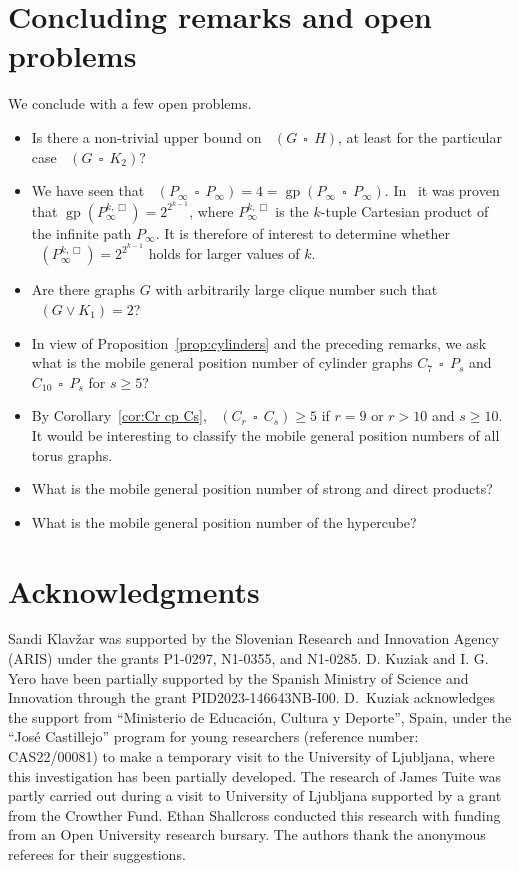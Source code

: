 \documentclass[a4paper,12pt]{article}
\DeclareMathOperator{\mob}{Mob_{gp}}
\DeclareMathOperator{\gp}{gp}
\DeclareMathOperator{\cp}{\,\square\,}
\theoremstyle{definition}
\begin{document}
	
	\section{Concluding remarks and open problems}
	\label{sec:conclude}
	
	We conclude with a few open problems.
	
	\begin{itemize}
		\item Is there a non-trivial upper bound on $\mob(G\cp H)$, at least for the particular case $\mob(G\cp K_2)$?
		\item We have seen that $\mob(P_\infty\cp P_\infty)=4=\gp(P_\infty\cp P_\infty)$. In~\cite[Theorem 1]{KlavzarRus} it was proven that $\gp(P_\infty^{k,\Box})= 2^{2^{k-1}}$, where $P_\infty^{k,\Box}$ is the $k$-tuple Cartesian product of the infinite path $P_\infty$. It is therefore of interest to determine whether $\mob(P_\infty^{k,\Box})= 2^{2^{k-1}}$ holds for larger values of $k$.
		\item Are there graphs $G$ with arbitrarily large clique number such that $\mob (G \vee K_1) = 2$?
		\item In view of Proposition~\ref{prop:cylinders} and the preceding remarks, we ask what is the mobile general position number of cylinder graphs $C_7 \cp P_s$ and $C_{10} \cp P_s$ for $s \geq 5$?
		\item By Corollary~\ref{cor:Cr cp Cs}, $\mob (C_r \cp C_s) \geq 5$ if $r = 9$ or $r > 10$ and $s \geq 10$. It would be interesting to classify the mobile general position numbers of all torus graphs. 
		\item What is the mobile general position number of strong and direct products?
		\item What is the mobile general position number of the hypercube?
		
		
	\end{itemize}
	
	\section*{Acknowledgments}
	
	Sandi Klav\v zar was supported by the Slovenian Research and Innovation Agency (ARIS) under the grants P1-0297, N1-0355, and N1-0285. D. Kuziak and I. G. Yero have been partially supported by the Spanish Ministry of Science and Innovation through the grant PID2023-146643NB-I00. D.\ Kuziak acknowledges the support from ``Ministerio de Educaci\'on, Cultura y Deporte'', Spain, under the ``Jos\'e Castillejo'' program for young researchers (reference number: CAS22/00081) to make a temporary visit to the University of Ljubljana, where this investigation has been partially developed. The research of James Tuite was partly carried out during a visit to University of Ljubljana supported by a grant from the Crowther Fund. Ethan Shallcross conducted this research with funding from an Open University research bursary. The authors thank the anonymous referees for their suggestions.
	
\end{document}
